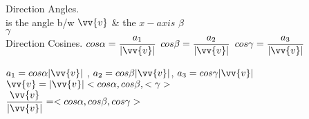 \noindent{\color{smalt(darkpowderblue)}\rule{\linewidth}{.2mm}}
\begin{paracol}{2}
Direction Angles.\\
is the angle b/w $\vv{v}$ \& the  $x - axis$ 
$\beta$ \\
$\gamma$\\
\switchcolumn
Direction Cosines.
$cos \alpha = \dfrac{a_1}{|\vv{v}|}$
$cos \beta = \dfrac{a_2}{|\vv{v}|}$
$cos\gamma = \dfrac{a_3}{|\vv{v}|}$
\end{paracol}

$a_1 = cos \alpha |\vv{v}|$ , $a_2 = cos \beta |\vv{v}|$, $a_3 = cos \gamma |\vv{v}|$ \\
$\vv{v} = |\vv{v}| <cos\alpha,cos\beta,<\gamma> $\\
$\dfrac{\vv{v}}{|\vv{v}|} = <cos \alpha , cos \beta , cos \gamma>$ 

